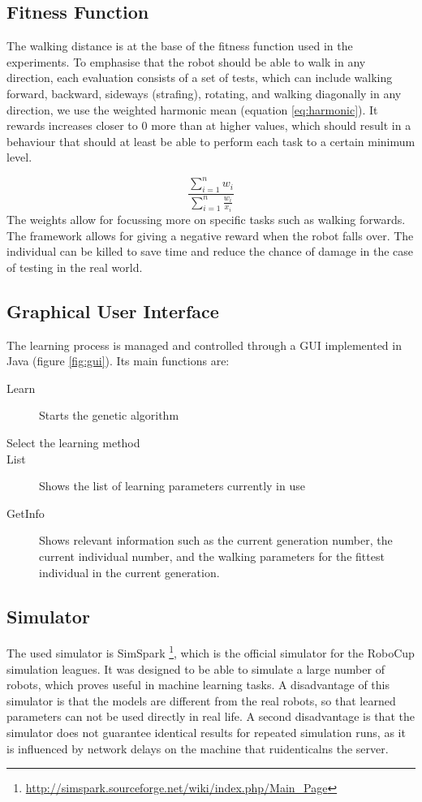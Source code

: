 \documentclass{article}
\begin{document}
\subsection{Fitness Function}

The walking distance is at the base of the fitness function used in the 
experiments. To emphasise that the robot should be able to walk in any 
direction, each evaluation consists of a set of tests, which can include
walking forward, backward, sideways (strafing), rotating, and walking
diagonally in any direction, we use the weighted harmonic mean (equation
\ref{eq:harmonic}). It rewards increases closer to 0 more than at higher
values, which should result in a behaviour that should at least be able to
perform each task to a certain minimum level.

\begin{equation}
	\frac{\sum^{n}_{i=1} w_i} {\sum^{n}_{i=1}\frac{w_i}{x_i}}
    \label{eq:harmonic}
\end{equation}
The weights allow for focussing more on specific tasks such as walking forwards.
The framework allows for giving a negative reward when the robot falls over.
The individual can be killed to save time and reduce the chance of damage in
the case of testing in the real world.
\subsection{Graphical User Interface}
The learning process is managed and controlled through a GUI implemented in Java (figure \ref{fig:gui}). 
Its main functions are:

\begin{description}
\item[Learn] Starts the genetic algorithm
\item[Select the learning method]
\item[List] Shows the list of learning parameters currently in use
\item[GetInfo] Shows relevant information such as the current generation number, the current individual number, and the walking parameters for the fittest individual in the current generation.
\end{description}

\subsection{Simulator}
The used simulator is SimSpark \footnote{\url{http://simspark.sourceforge.net/wiki/index.php/Main_Page}}, which is the official simulator for the RoboCup simulation leagues. It was designed to be able to simulate a large number of robots, which proves useful in machine learning tasks. A disadvantage of this simulator is that the models are 
different from the real robots, so that learned parameters can not be used
directly in real life. A second disadvantage is that the simulator does not
guarantee identical results for repeated simulation runs, as it is influenced
by network delays on the machine that ruidenticalns the server. 
\end{document}

